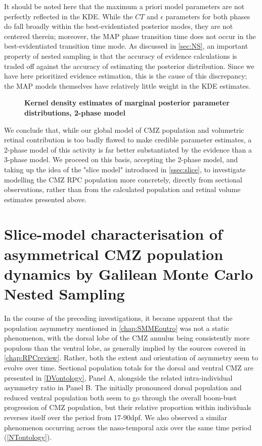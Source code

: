 It should be noted here that the maximum a priori model parameters are not perfectly reflected in the KDE. While the $CT$ and $\epsilon$ parameters for both phases do fall broadly within the best-evidentiated posterior modes, they are not centered therein; moreover, the MAP phase transition time does not occur in the best-evidentiated transition time mode. As discussed in \autoref{sec:NS}, an important property of nested sampling is that the accuracy of evidence calculations is traded off against the accuracy of estimating the posterior distribution. Since we have here prioritized evidence estimation, this is the cause of this discrepancy; the MAP models themselves have relatively little weight in the KDE estimates.

\begin{figure}[!h]
    \caption{{\bf Kernel density estimates of marginal posterior parameter distributions, 2-phase model}}
    \label{phasemarginals}
\end{figure}

We conclude that, while our global model of CMZ population and volumetric retinal contribution is too badly flawed to make credible parameter estimates, a 2-phase model of this activity is far better substantiated by the evidence than a 3-phase model. We proceed on this basis, accepting the 2-phase model, and taking up the idea of the "slice model" introduced in \autoref{ssec:slice}, to investigate modelling the CMZ RPC population more concretely, directly from sectional observations, rather than from the calculated population and retinal volume estimates presented above.

\section{Slice-model characterisation of asymmetrical CMZ population dynamics by Galilean Monte Carlo Nested Sampling}

In the course of the preceding investigations, it became apparent that the population asymmetry mentioned in \autoref{chap:SMMEoutro} was not a static phenomenon, with the dorsal lobe of the CMZ annulus being consistently more populous than the ventral lobe, as generally implied by the sources covered in \autoref{chap:RPCreview}. Rather, both the extent and orientation of asymmetry seem to evolve over time. Sectional population totals for the dorsal and ventral CMZ are presented in \autoref{DVontology}, Panel A, alongside the related intra-individual asymmetry ratio in Panel B. The initially pronounced dorsal population and reduced ventral population both seem to go through the overall boom-bust progression of CMZ population, but their relative proportion within individuals reverses itself over the period from 17-90dpf. We also observed a similar phenomenon occurring across the naso-temporal axis over the same time period (\autoref{NTontology}).

